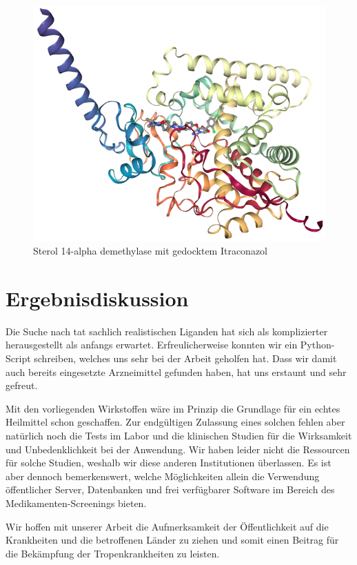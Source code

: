 \documentclass[10pt]{article}
\begin{document}
    \begin{figure}
        \centering
        \includegraphics[width=0.6\linewidth]{Sterol 14-alpha demethylase mit gedocktem Itraconazol}
        \caption{Sterol 14-alpha demethylase mit gedocktem Itraconazol}\label{fig:figure-sterol-Itraconazol}
    \end{figure}


    \section{Ergebnisdiskussion}\label{sec:ergebnisdiskussion}
    Die Suche nach tat sachlich realistischen Liganden hat sich als komplizierter herausgestellt als anfangs erwartet.
    Erfreulicherweise konnten wir ein Python-Script schreiben, welches uns sehr bei der Arbeit geholfen hat. Dass wir
    damit auch bereits eingesetzte Arzneimittel gefunden haben, hat uns erstaunt und sehr gefreut.

    Mit den vorliegenden Wirkstoffen wäre im Prinzip die Grundlage für ein echtes Heilmittel schon geschaffen. Zur
    endgültigen Zulassung eines solchen fehlen aber natürlich noch die Tests im Labor und die klinischen Studien für
    die Wirksamkeit und Unbedenklichkeit bei der Anwendung.
    Wir haben leider nicht die Ressourcen für solche Studien,
    weshalb wir diese anderen Institutionen überlassen.
    Es ist aber dennoch bemerkenswert, welche Möglichkeiten
    allein die Verwendung öffentlicher Server, Datenbanken und frei verfügbarer Software im Bereich des
    Medikamenten-Screenings bieten.

    Wir hoffen mit unserer Arbeit die Aufmerksamkeit der Öffentlichkeit auf die Krankheiten und die betroffenen
    Länder zu ziehen und somit einen Beitrag für die Bekämpfung der Tropenkrankheiten zu leisten.
\end{document}
